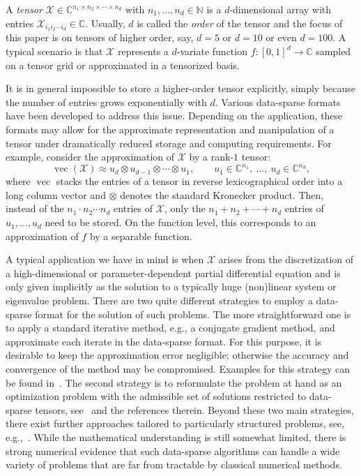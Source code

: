 \documentclass[11pt, a4paper]{article}
\newcommand{\calX}{\mathcal{X}}
\newcommand{\C}{{\mathbb C}}
\newcommand{\N}{{\mathbb N}}
\DeclareMathOperator{\vect}{vec}
\begin{document}
A \emph{tensor} $\calX \in \C^{n_1\times n_2\times\cdots \times n_d}$ with $n_1,\ldots,n_d\in \N$ is a $d$-dimensional array with entries $\calX_{i_1 i_2 \cdots i_d} \in \C$. Usually,
$d$ is called the \emph{order} of the tensor and the focus of this paper is on tensors of higher 
order, say, $d = 5$ or $d = 10$ or even $d = 100$. A typical scenario is that $\calX$ represents a $d$-variate function $f: [0,1]^d \to \C$ sampled on a tensor grid or approximated in a tensorized basis.

It is in general impossible to store a higher-order tensor explicitly, simply because
the number of entries grows exponentially with $d$.
Various data-sparse formats have been developed to address this issue. Depending on the application,
these formats may allow for the approximate representation and manipulation of a tensor under dramatically
reduced storage and computing requirements. For example, consider the approximation of $\calX$ by
a rank-$1$ tensor:
\begin{equation} \label{eq:tensorrank1}
 \vect(\calX) \approx u_d \otimes u_{d-1} \otimes \cdots \otimes u_1, \qquad u_1 \in \C^{n_1},\ \ldots,\ u_d \in \C^{n_d},
\end{equation}
where $\vect$ stacks the entries of a tensor in reverse lexicographical order
into a long column vector and $\otimes$ denotes the standard Kronecker product. Then, instead of the $n_1\cdot n_2 \cdots n_d$ entries of $\calX$, only the $n_1+n_2+\cdots+n_d$ entries of $u_1,\ldots,u_d$ need to be stored.
On the function level, this corresponds to an approximation of $f$ by a separable function.

A typical application we have in mind is when $\calX$ arises from the discretization
of a high-dimensional or parameter-dependent partial differential equation and is only given implicitly
as the solution to a typically huge (non)linear system or eigenvalue problem. There are two quite different
strategies to employ a data-sparse format for the solution of such problems. The more straightforward
one is to apply a standard iterative method, e.g., a conjugate gradient method, and approximate each iterate in the data-sparse format.
For this purpose, it is desirable to keep the approximation error negligible; otherwise the accuracy and convergence of the method may be compromised. Examples for this strategy can be found in~\cite{BalG10,HacKST08,KhoO10,KhoS10,KreT10b}.
The second strategy is to reformulate the problem at hand as an optimization problem with the admissible set of solutions
restricted to data-sparse tensors, see~\cite{Espig2012e,HolRS10b,Huckle2013,KocL10,OseK10,Sch11} and the references therein.  Beyond these two main strategies, there exist further approaches tailored to particularly structured problems, see, e.g.,~\cite{Gra04a,KreT10}. While the mathematical understanding is still somewhat limited, there is strong numerical evidence that such data-sparse algorithms can handle a wide variety of problems that are far from tractable by classical numerical methods. 
\end{document}
